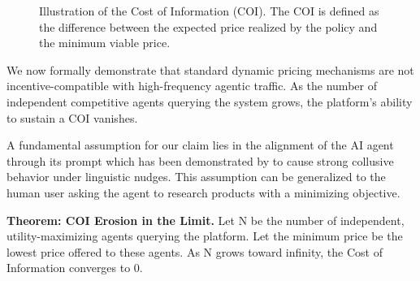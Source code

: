 \begin{figure}[ht]
    \centering
    \caption{Illustration of the Cost of Information (COI). The COI is defined as the difference between the expected price realized by the policy and the minimum viable price.}
    \label{fig:coi_illustration}
\end{figure}

We now formally demonstrate that standard dynamic pricing mechanisms are not incentive-compatible with high-frequency agentic traffic. As the number of independent competitive agents querying the system grows, the platform's ability to sustain a COI vanishes.

A fundamental assumption for our claim lies in the alignment of the AI agent through its prompt which has been demonstrated by \textcite{fish_algorithmic_2025} to cause strong collusive behavior under linguistic nudges. This assumption can be generalized to the human user asking the agent to research products with a minimizing objective.

\textbf{Theorem: COI Erosion in the Limit.} Let N be the number of independent, utility-maximizing agents querying the platform. Let the minimum price be the lowest price offered to these agents. As N grows toward infinity, the Cost of Information converges to 0.

